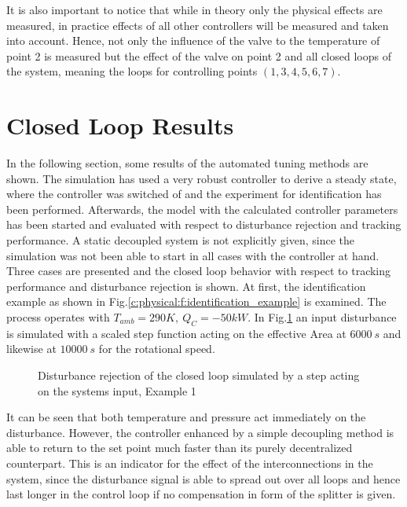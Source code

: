 It is also important to notice that while in theory only the physical effects are measured, in practice effects of all other controllers will be measured and taken into account. Hence, not only the influence of the valve to the temperature of point 2 is measured but the effect of the valve on point 2 and all closed loops of the system, meaning the loops for controlling points $(1,3,4,5,6,7)$.\\


\newpage
\section{Closed Loop Results} \label{c:physical:s:closedloop}

In the following section, some results of the automated tuning methods are shown. The simulation has used a very robust controller to derive a steady state, where the controller was switched of and the experiment for identification has been performed. Afterwards, the model with the calculated controller parameters has been started and evaluated with respect to disturbance rejection and tracking performance. A static decoupled system is not explicitly given, since the simulation was not been able to start in all cases with the controller at hand.\\

Three cases are presented and the closed loop behavior with respect to tracking performance and disturbance rejection is shown. At first, the identification example as shown in Fig.\ref{c:physical:f:identification_example} is examined. The process operates with $T_{amb} = 290 K,~Q_C = -50 kW$. In Fig.\ref{c:physical:f:disturbance1} an input disturbance is simulated with a scaled step function acting on the effective Area at $6000~s$ and likewise at $10000~s$ for the rotational speed.

\begin{figure}[H]

\caption{Disturbance rejection of the closed loop simulated by a step acting on the systems input, Example 1}
\label{c:physical:f:disturbance1}
\end{figure}

It can be seen that both temperature and pressure act immediately on the disturbance. However, the controller enhanced by a simple decoupling method is able to return to the set point much faster than its purely decentralized counterpart. This is an indicator for the effect of the interconnections in the system, since the disturbance signal is able to spread out over all loops and hence last longer in the control loop if no compensation in form of the splitter is given.\\

